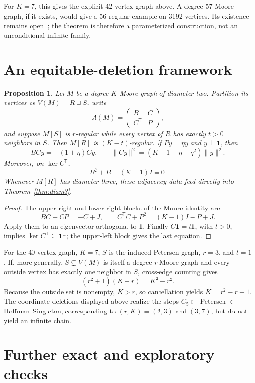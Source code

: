 \documentclass[a4paper,11pt,reqno]{amsart}
\theoremstyle{plain}
\newtheorem{proposition}[theorem]{Proposition}
\theoremstyle{definition}
\theoremstyle{remark}
\newcommand{\one}{\mathbf 1}
\begin{document}
For \(K=7\), this gives the explicit 42-vertex graph above.  A degree-57
Moore graph, if it exists, would give a 56-regular example on 3192 vertices.
Its existence remains open~\cite{SmithMontemanni2026}; the theorem is
therefore a parameterized construction, not an unconditional infinite family.

\section{An equitable-deletion framework}

\begin{proposition}\label{prop:equitable-delete}
Let \(M\) be a degree-\(K\) Moore graph of diameter two.  Partition its
vertices as \(V(M)=R\sqcup S\), write
\[
 A(M)=\begin{pmatrix}B&C\\C^{\mathsf T}&P\end{pmatrix},
\]
and suppose \(M[S]\) is \(r\)-regular while every vertex of \(R\) has
exactly \(t>0\) neighbors in \(S\).  Then \(M[R]\) is
\((K-t)\)-regular.  If \(Py=\eta y\) and \(y\perp\one\), then
\[
 BCy=-(1+\eta)Cy,
 \qquad
 \lVert Cy\rVert^2=(K-1-\eta-\eta^2)\lVert y\rVert^2.
\]
Moreover, on \(\ker C^{\mathsf T}\),
\[
 B^2+B-(K-1)I=0.
\]
Whenever \(M[R]\) has diameter three, these adjacency data feed directly
into Theorem~\ref{thm:diam3}.
\end{proposition}

\begin{proof}
The upper-right and lower-right blocks of the Moore identity are
\[
 BC+CP=-C+J,
 \qquad
 C^{\mathsf T}C+P^2=(K-1)I-P+J.
\]
Apply them to an eigenvector orthogonal to \(\one\).  Finally
\(C\one=t\one\), with \(t>0\), implies
\(\ker C^{\mathsf T}\subseteq\one^\perp\); the upper-left block gives the
last equation.
\end{proof}

For the 40-vertex graph, \(K=7\), \(S\) is the induced Petersen graph,
\(r=3\), and \(t=1\).  If, more generally, \(S\subsetneq V(M)\) is itself a
degree-\(r\) Moore graph and every outside vertex has exactly one neighbor in
\(S\), cross-edge counting gives
\[
 (r^2+1)(K-r)=K^2-r^2.
\]
Because the outside set is nonempty, \(K>r\), so cancellation yields
\(K=r^2-r+1\).  The coordinate deletions displayed above realize the steps
\(C_5\subset\) Petersen \(\subset\) Hoffman--Singleton, corresponding to
\((r,K)=(2,3)\) and \((3,7)\), but do not yield an infinite chain.

\section{Further exact and exploratory checks}
\end{document}
